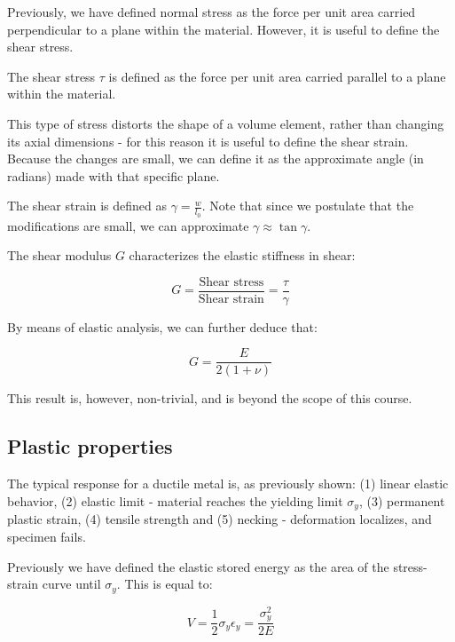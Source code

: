 \documentclass{article}
\begin{document}
Previously, we have defined normal stress as the force per unit area carried perpendicular to a plane within the material. However, it is useful to define the shear stress.

\begin{definition}
    The shear stress $\tau$ is defined as the force per unit area carried parallel to a plane within the material.
\end{definition}

This type of stress distorts the shape of a volume element, rather than changing its axial dimensions - for this reason it is useful to define the shear strain. Because the changes are small, we can define it as the approximate angle (in radians) made with that specific plane.

\begin{definition}
    The shear strain is defined as $\gamma = \frac{w}{l_0}$. Note that since we postulate that the modifications are small, we can approximate $\gamma \approx \tan{\gamma}$.
\end{definition}

\begin{definition}
    The shear modulus $G$ characterizes the elastic stiffness in shear:

    \[ G = \frac{\text{Shear stress}}{\text{Shear strain}} = \frac{\tau}{\gamma} \]

    By means of elastic analysis, we can further deduce that:

    \[ G = \frac{E}{2(1 + \nu)} \]

    This result is, however, non-trivial, and is beyond the scope of this course.
\end{definition}

\subsection{Plastic properties}

The typical response for a ductile metal is, as previously shown: (1) linear elastic behavior, (2) elastic limit - material reaches the yielding limit $\sigma_y$, (3) permanent plastic strain, (4) tensile strength and (5) necking - deformation localizes, and specimen fails.

Previously we have defined the elastic stored energy as the area of the stress-strain curve until $\sigma_y$. This is equal to:

\[ V = \frac{1}{2}\sigma_y\epsilon_y = \frac{\sigma_y^2}{2E} \]
\end{document}
